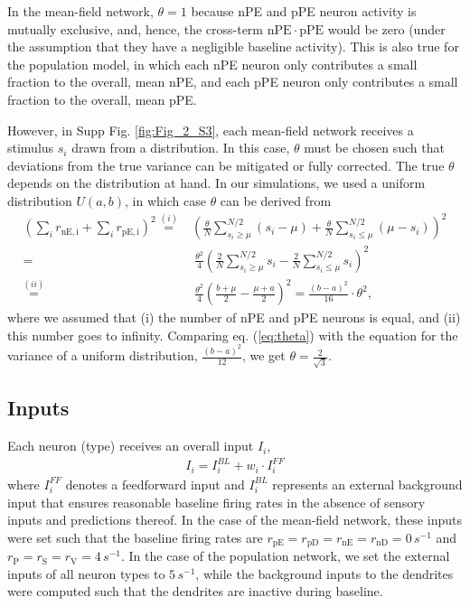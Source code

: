 \documentclass[10pt,a4paper,draft]{article}
\begin{document}
In the mean-field network, $\theta = 1$ because nPE and pPE neuron activity is mutually exclusive, and, hence, the cross-term $\mathrm{nPE}\cdot\mathrm{pPE}$ would be zero (under the assumption that they have a negligible baseline activity). This is also true for the population model, in which each nPE neuron only contributes a small fraction to the overall, mean nPE, and each pPE neuron only contributes a small fraction to the overall, mean pPE. 

However, in Supp Fig. \ref{fig:Fig_2_S3}, each mean-field network receives a stimulus $s_i$ drawn from a distribution. In this case, $\theta$ must be chosen such that deviations from the true variance can be mitigated or fully corrected. The true $\theta$ depends on the distribution at hand. In our simulations, we used a uniform distribution $U(a,b)$, in which case $\theta$ can be derived from
%
\begin{align}
\left( \sum_{i} r_\mathrm{nE,i} + \sum_{i} r_\mathrm{pE,i}\right)^2 \overset{(i)}{=} & \left( \frac{\theta}{N}  \sum_{s_i \geq \mu}^{N/2} (s_i - \mu) + \frac{\theta}{N}  \sum_{s_i \leq \mu}^{N/2} (\mu - s_i )\right)^2 \nonumber \\
%
=&\ \frac{\theta^2}{4} \left( \frac{2}{N} \sum_{s_i \geq \mu}^{N/2} s_i - \frac{2}{N} \sum_{s_i \leq \mu}^{N/2} s_i\right)^2\nonumber\\
%
\overset{(ii)}{=}&\ \frac{\theta^2}{4} \left( \frac{b+\mu}{2} - \frac{\mu + a}{2} \right)^2 = \frac{(b-a)^2}{16} \cdot \theta^2,
\label{eq:theta}
\end{align}
%
where we assumed that (i) the number of nPE and pPE neurons is equal, and (ii) this number goes to infinity. Comparing eq. (\ref{eq:theta}) with the equation for the variance of a uniform distribution, $\frac{(b-a)^2}{12}$, we get $\theta = \frac{2}{\sqrt{3}}$.

\subsection{Inputs}
%
Each neuron (type) receives an overall input $I_i$,
%
\begin{align*}
I_i = I_i^{BL} + w_i \cdot I_{i}^{FF}
\end{align*}
%
where $I_{i}^{FF}$ denotes a feedforward input and $I_i^{BL}$ represents an external background input that ensures reasonable baseline firing rates in the absence of sensory inputs and predictions thereof. In the case of the mean-field network, these inputs were set such that the baseline firing rates are $r_\mathrm{pE}=r_\mathrm{pD}=r_\mathrm{nE}=r_\mathrm{nD}=0\, s^{-1}$ and $r_\mathrm{P} = r_\mathrm{S}=r_\mathrm{V}=4\, s^{-1}$. In the case of the population network, we set the external inputs of all neuron types to $5\, s^{-1}$, while the background inputs to the dendrites were computed such that the dendrites are inactive during baseline.
\end{document}
